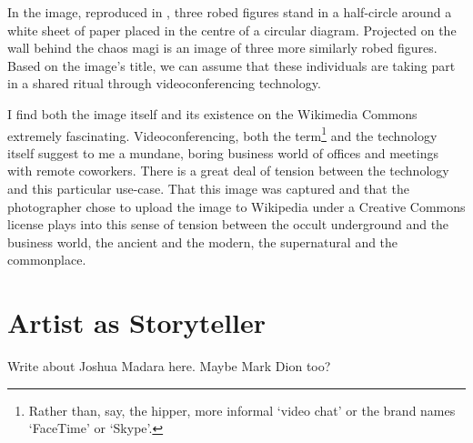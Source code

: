 \documentclass[a4paper,nobib]{tufte-handout}
\begin{document}
In the image, reproduced in \autocite{wiki:chaos}, three robed figures stand in a half-circle around a white sheet of paper placed in the centre of a circular diagram. Projected on the wall behind the chaos magi is an image of three more similarly robed figures. Based on the image's title, we can assume that these individuals are taking part in a shared ritual through videoconferencing technology.

I find both the image itself and its existence on the Wikimedia Commons extremely fascinating. Videoconferencing, both the term\footnote{Rather than, say, the hipper, more informal `video chat' or the brand names `FaceTime' or `Skype'.} and the technology itself suggest to me a mundane, boring business world of offices and meetings with remote coworkers. There is a great deal of tension between the technology and this particular use-case. That this image was captured and that the photographer chose to upload the image to Wikipedia under a Creative Commons license plays into this sense of tension between the occult underground and the business world, the ancient and the modern, the supernatural and the commonplace.

\section{Artist as Storyteller}
Write about Joshua Madara here\autocite{madara,madarabeing,madaramagic}. Maybe Mark Dion too?

\printbibliography
\end{document}
